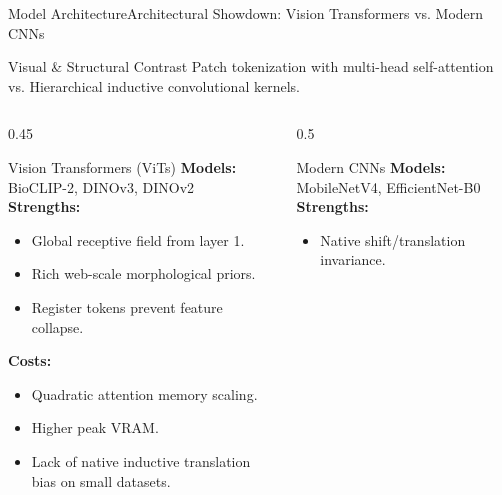 \begin{frame}{Model Architecture}{Architectural Showdown: Vision Transformers vs. Modern CNNs}
    \vspace{-0.2cm}
    \begin{block}{Visual \& Structural Contrast}
        \scriptsize
        Patch tokenization with multi-head self-attention vs. Hierarchical inductive convolutional kernels.
    \end{block}

    \vspace{-0.2cm}
    \begin{columns}[T]
        \begin{column}{0.45\textwidth}
            \begin{block}{Vision Transformers (ViTs)}
                \scriptsize
                \textbf{Models:} BioCLIP-2, DINOv3, DINOv2\\[0.1cm]
                \textbf{Strengths:}
                \begin{itemize}
                    \item Global receptive field from layer 1.
                    \item Rich web-scale morphological priors.
                    \item Register tokens prevent feature collapse.
                \end{itemize}
                \vspace{0.1cm}
                \textbf{Costs:}
                \begin{itemize}
                    \item Quadratic attention memory scaling.
                    \item Higher peak VRAM.
                    \item Lack of native inductive translation bias on small datasets.
                \end{itemize}
            \end{block}
        \end{column}
        \begin{column}{0.5\textwidth}
            \begin{block}{Modern CNNs}
                \scriptsize
                \textbf{Models:} MobileNetV4, EfficientNet-B0\\[0.1cm]
                \textbf{Strengths:}
                \begin{itemize}
                    \item Native shift/translation invariance.

\end{itemize}
\end{block}
\end{column}
\end{columns}
\end{frame}
